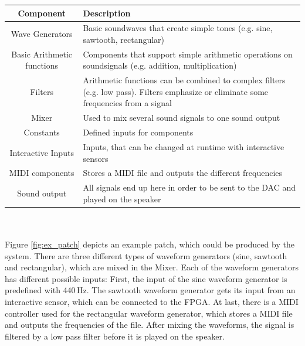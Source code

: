 	 \begin{tabular}[h]{|c|p{9.75cm}|}
	  \hline
	  Component & Description \\
	  \hline
	  \hline
	  Wave Generators & Basic soundwaves that create simple tones (e.g. sine, sawtooth, rectangular) \\\hline
		Basic Arithmetic functions & Components that support simple arithmetic operations on soundsignals (e.g. addition, multiplication)\\\hline
		Filters & Arithmetic functions can be combined to complex filters (e.g. low pass). Filters emphasize or eliminate some frequencies from a signal \\\hline
		Mixer & Used to mix several sound signals to one sound output \\\hline
		Constants & Defined inputs for components \\\hline
		Interactive Inputs & Inputs, that can be changed at runtime with interactive sensors \\\hline
		MIDI components & Stores a MIDI file and outputs the different frequencies \\\hline
		Sound output & All signals end up here in order to be sent to the \ac{DAC} and played on the speaker \\\hline
	 \end{tabular}
\\\\


Figure \ref{fig:ex_patch} depicts an example patch, which could be produced by the system. 
There are three different types of waveform generators (sine, sawtooth and rectangular), which are mixed in the Mixer. 
Each of the waveform generators has different possible inputs: 
First, the input of the sine waveform generator is predefined with 440\,Hz. 
The sawtooth waveform generator gets its input from an interactive sensor, which can be connected to the \ac{FPGA}. 
At last, there is a MIDI controller used for the rectangular waveform generator, which stores a MIDI file and outputs the frequencies of the file.
After mixing the waveforms, the signal is filtered by a low pass filter before it is played on the speaker.

